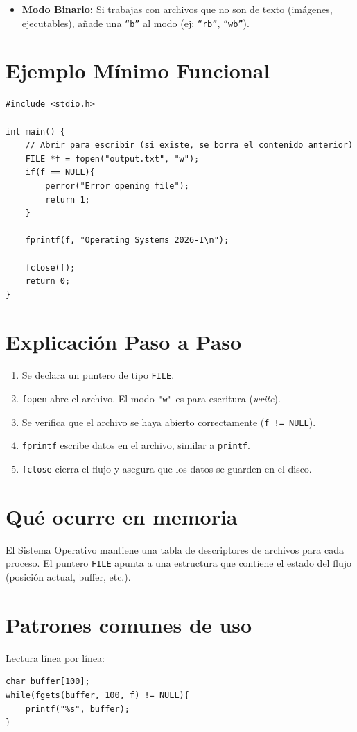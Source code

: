 \documentclass[12pt,a4paper]{article}
\begin{document}
\begin{itemize}
    \item \textbf{Modo Binario:} Si trabajas con archivos que no son de texto (imágenes, ejecutables), añade una \texttt{``b''} al modo (ej: \texttt{``rb''}, \texttt{``wb''}).
\end{itemize}

\section{Ejemplo Mínimo Funcional}
\begin{lstlisting}
#include <stdio.h>

int main() {
    // Abrir para escribir (si existe, se borra el contenido anterior)
    FILE *f = fopen("output.txt", "w");
    if(f == NULL){
        perror("Error opening file");
        return 1;
    }

    fprintf(f, "Operating Systems 2026-I\n");
    
    fclose(f);
    return 0;
}
\end{lstlisting}

\section{Explicación Paso a Paso}
\begin{enumerate}
    \item Se declara un puntero de tipo \texttt{FILE}.
    \item \texttt{fopen} abre el archivo. El modo \texttt{"w"} es para escritura (\textit{write}).
    \item Se verifica que el archivo se haya abierto correctamente (\texttt{f != NULL}).
    \item \texttt{fprintf} escribe datos en el archivo, similar a \texttt{printf}.
    \item \texttt{fclose} cierra el flujo y asegura que los datos se guarden en el disco.
\end{enumerate}

\section{Qué ocurre en memoria}
El Sistema Operativo mantiene una tabla de descriptores de archivos para cada proceso. El puntero \texttt{FILE} apunta a una estructura que contiene el estado del flujo (posición actual, buffer, etc.).

\section{Patrones comunes de uso}
Lectura línea por línea:
\begin{lstlisting}
char buffer[100];
while(fgets(buffer, 100, f) != NULL){
    printf("%s", buffer);
}
\end{lstlisting}
\end{document}
